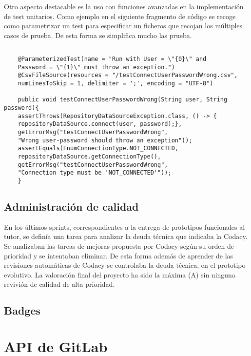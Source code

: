 Otro aspecto destacable es la uso con funciones avanzadas en la implementación de test unitarios. 
Como ejemplo en el siguiente fragmento de código se recoge como parametrizar un test para especificar un ficheros que recojan los múltiples casos de prueba.
De esta forma se simplifica mucho las prueba.
{\tiny 
	\begin{lstlisting}
	
	@ParameterizedTest(name = "Run with User = \"{0}\" and 
	Password = \"{1}\" must throw an exception.")
	@CsvFileSource(resources = "/testConnectUserPasswordWrong.csv", 
	numLinesToSkip = 1, delimiter = ';', encoding = "UTF-8")
	
	public void testConnectUserPasswordWrong(String user, String password){
	assertThrows(RepositoryDataSourceException.class, () -> {
	repositoryDataSource.connect(user, password);},
	getErrorMsg("testConnectUserPasswordWrong", 
	"Wrong user-password should throw an exception"));
	assertEquals(EnumConnectionType.NOT_CONNECTED, 
	repositoryDataSource.getConnectionType(),
	getErrorMsg("testConnectUserPasswordWrong", 
	"Connection type must be 'NOT_CONNECTED'"));
	}
	\end{lstlisting}
}

\subsection{Administración de calidad}
En los últimos sprints, correspondientes a la entrega de prototipos funcionales al tutor,
se definía una tarea para analizar la deuda técnica que indicaba la Codacy.
Se analizaban las tareas de mejoras propuesta por Codacy según su orden de prioridad y se intentaban eliminar.
De esta forma además de aprender de las revisiones automáticas de Codacy se controlaba la deuda técnica, en el prototipo evolutivo.
La valoración final del proyecto ha sido la máxima (A) sin ninguna revivión de calidad de alta prioridad.

\subsection{Badges}

\section{API de GitLab}

